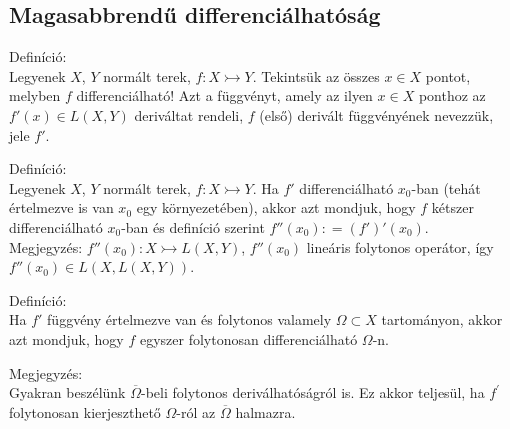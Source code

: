 \documentclass[12pt,a4paper]{scrartcl}
\newenvironment{definicio}{}{}
\newenvironment{megjegyzes}{}{}
\begin{document}
\hypertarget{magasabbrendu-differencialhatosag}{%
\subsection{Magasabbrendű
differenciálhatóság}\label{magasabbrendu-differencialhatosag}}

\begin{definicio}

Definíció:\\
Legyenek \(X\), \(Y\) normált terek,
\(\left. f:X\rightarrowtail Y \right.\). Tekintsük az összes \(x \in X\)
pontot, melyben \(f\) differenciálható! Azt a függvényt, amely az ilyen
\(x \in X\) ponthoz az \(f'\left( x \right) \in L\left( {X,Y} \right)\)
deriváltat rendeli, \(f\) (első) derivált függvényének nevezzük, jele
\(f'\).

\end{definicio}

\begin{definicio}

Definíció:\\
Legyenek \(X\), \(Y\) normált terek,
\(\left. f:X\rightarrowtail Y \right.\). Ha \(f'\) differenciálható
\(x_{0}\)-ban (tehát értelmezve is van \(x_{0}\) egy környezetében),
akkor azt mondjuk, hogy \(f\) kétszer differenciálható \(x_{0}\)-ban és
definíció szerint
\(f''\left( x_{0} \right): = \left( {f'} \right)'\left( x_{0} \right)\).\\
Megjegyzés:
\(\left. f''\left( x_{0} \right):X\rightarrowtail L\left( {X,Y} \right) \right.\),
\(f''\left( x_{0} \right)\) lineáris folytonos operátor, így
\(f''\left( x_{0} \right) \in L\left( {X,L\left( {X,Y} \right)} \right)\).

\end{definicio}

\begin{definicio}

Definíció:\\
Ha \(f'\) függvény értelmezve van és folytonos valamely
\(\Omega \subset X\) tartományon, akkor azt mondjuk, hogy \(f\) egyszer
folytonosan differenciálható \(\Omega\)-n.

\end{definicio}

\begin{megjegyzes}

Megjegyzés:\\
Gyakran beszélünk \(\overline{\Omega}\)-beli folytonos deriválhatóságról
is. Ez akkor teljesül, ha \(f^{\prime}\) folytonosan kierjeszthető
\(\Omega\)-ról az \(\overline{\Omega}\) halmazra.

\end{megjegyzes}
\end{document}
